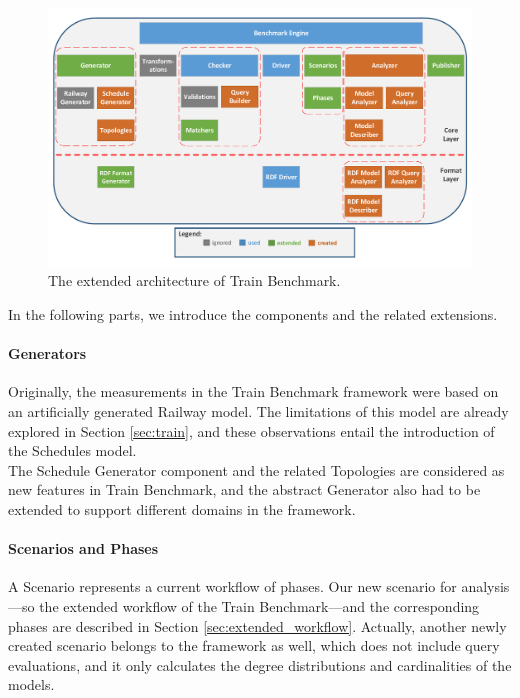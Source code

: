 \begin{figure}[!ht]
	\centering
	\includegraphics[width=150mm, keepaspectratio]{figures/architecture.pdf}
	\caption{The extended architecture of Train Benchmark.}
	\label{fig:architecture}
\end{figure}

In the following parts, we introduce the components and the related extensions.
\paragraph{Generators}
Originally, the measurements in the Train Benchmark framework were based on an artificially generated \textsf{Railway} model. The limitations of this model are already explored in Section \ref{sec:train}, and these observations entail the introduction of the \textsf{Schedules} model. \\%
The \textsf{Schedule Generator} component and the related \textsf{Topologies} are considered as new features in Train Benchmark, and the abstract \textsf{Generator} also had to be extended to support different domains in the framework.

\paragraph{Scenarios and Phases}

A \textsf{Scenario} represents a current workflow of phases. Our new scenario for analysis---so the extended workflow of the Train Benchmark---and the corresponding phases are described in Section \ref{sec:extended_workflow}. Actually, another newly created scenario belongs to the framework as well, which does not include query evaluations, and it only calculates the degree distributions and cardinalities of the models.

